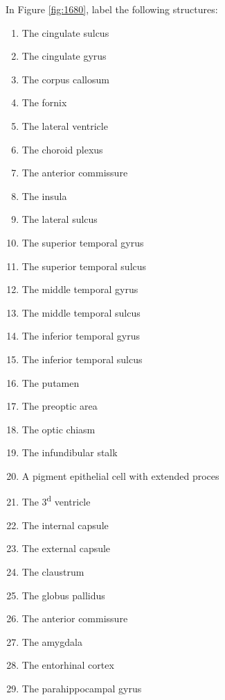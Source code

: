 \documentclass[]{book}
\providecommand{\tightlist}{%
  \setlength{\itemsep}{0pt}\setlength{\parskip}{0pt}}
\begin{document}
In Figure \ref{fig:1680}, label the following structures:

\begin{enumerate}
\def\labelenumi{\arabic{enumi}.}
\tightlist
\item
  The cingulate sulcus
\item
  The cingulate gyrus
\item
  The corpus callosum
\item
  The fornix
\item
  The lateral ventricle
\item
  The choroid plexus
\item
  The anterior commissure
\item
  The insula
\item
  The lateral sulcus
\item
  The superior temporal gyrus
\item
  The superior temporal sulcus
\item
  The middle temporal gyrus
\item
  The middle temporal sulcus
\item
  The inferior temporal gyrus
\item
  The inferior temporal sulcus
\item
  The putamen
\item
  The preoptic area
\item
  The optic chiasm
\item
  The infundibular stalk
\item
  A pigment epithelial cell with extended proces
\item
  The 3\textsuperscript{d} ventricle
\item
  The internal capsule
\item
  The external capsule
\item
  The claustrum
\item
  The globus pallidus
\item
  The anterior commissure
\item
  The amygdala
\item
  The entorhinal cortex
\item
  The parahippocampal gyrus
\end{enumerate}
\end{document}

